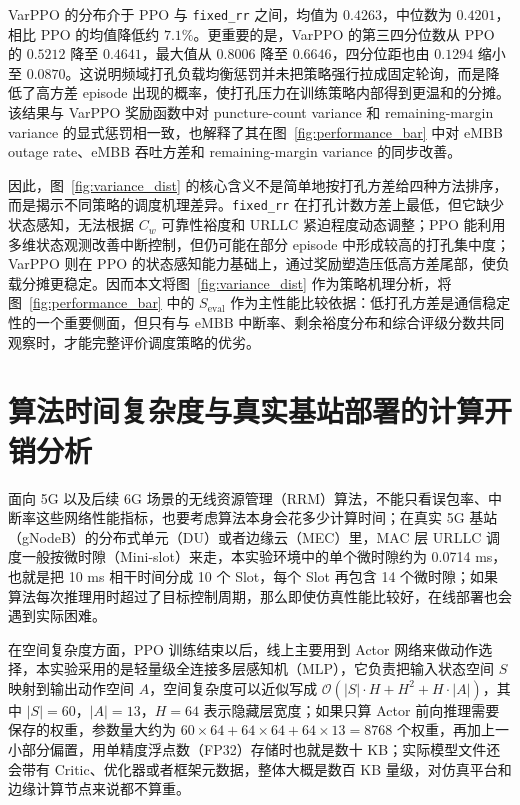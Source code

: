 VarPPO 的分布介于 PPO 与 \texttt{fixed\_rr} 之间，均值为 \(0.4263\)，中位数为 \(0.4201\)，相比 PPO 的均值降低约 \(7.1\%\)。更重要的是，VarPPO 的第三四分位数从 PPO 的 \(0.5212\) 降至 \(0.4641\)，最大值从 \(0.8006\) 降至 \(0.6646\)，四分位距也由 \(0.1294\) 缩小至 \(0.0870\)。这说明频域打孔负载均衡惩罚并未把策略强行拉成固定轮询，而是降低了高方差 episode 出现的概率，使打孔压力在训练策略内部得到更温和的分摊。该结果与 VarPPO 奖励函数中对 puncture-count variance 和 remaining-margin variance 的显式惩罚相一致，也解释了其在图~\ref{fig:performance_bar} 中对 eMBB outage rate、eMBB 吞吐方差和 remaining-margin variance 的同步改善。

因此，图~\ref{fig:variance_dist} 的核心含义不是简单地按打孔方差给四种方法排序，而是揭示不同策略的调度机理差异。\texttt{fixed\_rr} 在打孔计数方差上最低，但它缺少状态感知，无法根据 \(C_w\) 可靠性裕度和 URLLC 紧迫程度动态调整；PPO 能利用多维状态观测改善中断控制，但仍可能在部分 episode 中形成较高的打孔集中度；VarPPO 则在 PPO 的状态感知能力基础上，通过奖励塑造压低高方差尾部，使负载分摊更稳定。因而本文将图~\ref{fig:variance_dist} 作为策略机理分析，将图~\ref{fig:performance_bar} 中的 \(S_{\text{eval}}\) 作为主性能比较依据：低打孔方差是通信稳定性的一个重要侧面，但只有与 eMBB 中断率、剩余裕度分布和综合评级分数共同观察时，才能完整评价调度策略的优劣。

\section{算法时间复杂度与真实基站部署的计算开销分析}\label{45-ux7b97ux6cd5ux65f6ux95f4ux590dux6742ux5ea6ux4e0eux771fux5b9eux57faux7ad9ux90e8ux7f72ux7684ux8ba1ux7b97ux5f00ux9500ux5206ux6790}

面向 5G 以及后续 6G 场景的无线资源管理（RRM）算法，不能只看误包率、中断率这些网络性能指标，也要考虑算法本身会花多少计算时间；在真实 5G 基站（gNodeB）的分布式单元（DU）或者边缘云（MEC）里，MAC 层 URLLC 调度一般按微时隙（Mini-slot）来走，本实验环境中的单个微时隙约为 0.0714 ms，也就是把 10 ms 相干时间分成 10 个 Slot，每个 Slot 再包含 14 个微时隙；如果算法每次推理用时超过了目标控制周期，那么即使仿真性能比较好，在线部署也会遇到实际困难。

在空间复杂度方面，PPO 训练结束以后，线上主要用到 Actor 网络来做动作选择，本实验采用的是轻量级全连接多层感知机（MLP），它负责把输入状态空间 \(S\) 映射到输出动作空间 \(A\)，空间复杂度可以近似写成 \(\mathcal{O}(|S| \cdot H + H^2 + H \cdot |A|)\)，其中 \(|S|=60\)，\(|A|=13\)，\(H=64\) 表示隐藏层宽度；如果只算 Actor 前向推理需要保存的权重，参数量大约为 \(60\times64+64\times64+64\times13=8768\) 个权重，再加上一小部分偏置，用单精度浮点数（FP32）存储时也就是数十 KB；实际模型文件还会带有 Critic、优化器或者框架元数据，整体大概是数百 KB 量级，对仿真平台和边缘计算节点来说都不算重。

